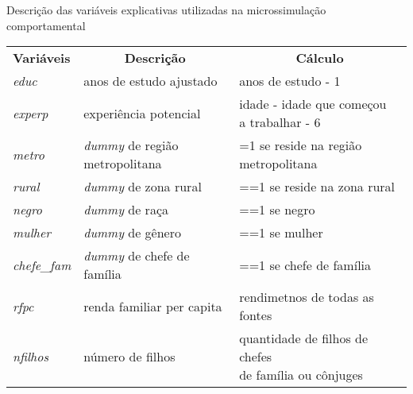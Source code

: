 \begin{apendicesenv}
	\newpage

	\begin{quadro}[h]
		\centering
		\small
		\begin{adjustwidth}{-1.5cm}{}
		\begin{threeparttable}
			\caption{Descrição das variáveis explicativas utilizadas na microssimulação comportamental}
			\begin{tabular}{|lll|}
				\hline
				\multirow{2}{*}{\textbf{Variáveis}} & \multicolumn{1}{c}{\multirow{2}{*}{\textbf{Descrição}}} & \multicolumn{1}{c|}{\multirow{2}{*}{\textbf{Cálculo}}} \\
				 & \multicolumn{1}{c}{} & \multicolumn{1}{c|}{} \\ \hline
				\textit{educ}           & anos de estudo ajustado                               & anos de estudo - 1                                                       \\[10pt] \hline
				\textit{experp}         & experiência potencial                                 & \makecell[l]{idade - idade que começou \\ a trabalhar - 6}               \\[10pt] \hline
				\textit{metro}          & \textit{dummy} de região metropolitana                & =1 se reside na região metropolitana                                     \\[10pt] \hline
				\textit{rural}          & \textit{dummy} de zona rural                          & ==1 se reside na zona rural                                              \\[10pt] \hline
				\textit{negro}          & \textit{dummy} de raça                                & ==1 se negro                                                             \\[10pt] \hline
				\textit{mulher}         & \textit{dummy} de gênero                              & ==1 se mulher                                                            \\[10pt] \hline
				\textit{chefe\_fam}     & \textit{dummy} de chefe de família                    & ==1 se chefe de família                                                  \\[10pt] \hline
				\textit{rfpc}           & renda familiar per capita                             & rendimetnos  de todas as fontes                                          \\[10pt] \hline
				\textit{nfilhos}        & número de filhos                                      & \makecell[l]{quantidade de filhos de chefes \\ de família ou cônjuges}   \\[10pt] \hline

\end{tabular}
\end{threeparttable}
\end{adjustwidth}
\end{quadro}
\end{apendicesenv}
